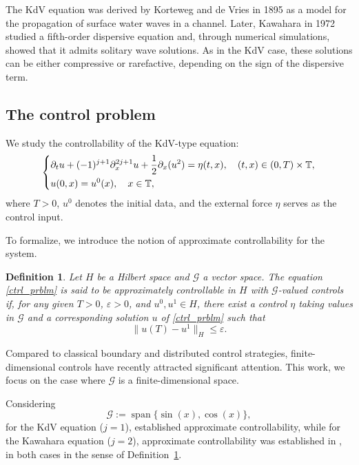 \documentclass[10pt, reqno]{amsart}
\newtheorem{definition}{Definition}
\numberwithin{equation}{section}
\begin{document}
The KdV equation was derived by Korteweg and de Vries \cite{KdV_1895} in 1895 as a model for the propagation of surface water waves in a channel. Later, Kawahara \cite{kawahara_1972} in 1972 studied a fifth-order dispersive equation and, through numerical simulations, showed that it admits solitary wave solutions. As in the KdV case, these solutions can be either compressive or rarefactive, depending on the sign of the dispersive term.

\subsection{The control problem} We study the controllability of the KdV-type equation:  
\begin{align}\label{ctrl_prblm}  
	\begin{dcases}  
		\partial_t u + (-1)^{j + 1} \partial_x^{2j + 1} u + \frac{1}{2} \partial_x(u^2) = \eta(t, x), \quad (t, x) \in (0, T) \times \mathbb{T}, \\  
		u(0, x) = u^0 (x), \quad x \in \mathbb{T},  
	\end{dcases}  
\end{align}  
where $T>0$, $u^0$ denotes the initial data, and the external force $\eta$ serves as the control input.

To formalize, we introduce the notion of approximate controllability for the system.

\begin{definition}\label{approxi_cntrl}
	Let $H$ be a Hilbert space and $\mathcal{G}$ a vector space. The equation \eqref{ctrl_prblm} is said to be approximately controllable in $H$ with $\mathcal{G}$-valued controls if, for any given $T>0$, $\varepsilon>0$, and $u^0,u^1 \in H$, there exist a control $\eta$ taking values in $\mathcal{G}$ and a corresponding solution $u$ of \eqref{ctrl_prblm} such that
	\[
	\|u(T)-u^1\|_{H} \le \varepsilon.
	\]
\end{definition}

Compared to classical boundary and distributed control strategies, finite-dimensional controls have recently attracted significant attention. This work, we focus on the case where $\mathcal{G}$ is a finite-dimensional space.

Considering
\[
\mathcal{G} := \operatorname{span}\{\sin(x),\cos(x)\},
\]
for the KdV equation ($j=1$), \cite{Chen23} established approximate controllability, while for the Kawahara equation ($j=2$), approximate controllability was established in \cite{Ahamed_Mondal_25}, in both cases in the sense of Definition~\ref{approxi_cntrl}.
\end{document}
